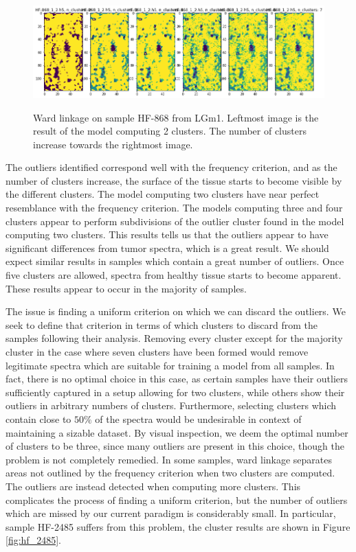 \begin{figure}[H]

    \centering
{\includegraphics[width=15cm]{images/Ward_linkage/LGm-1/HF-868_1_2.h5_0.png} }
\caption{Ward linkage on sample HF-868 from LGm1. Leftmost image is the result of the model computing 2 clusters. The number of clusters increase towards the rightmost image.\label{fig:WL_HF868}}%

\end{figure}

The outliers identified correspond well with the frequency criterion, and as the number of clusters increase, the surface of the tissue starts to become visible by the different clusters. The model computing two clusters have near perfect resemblance with the frequency criterion. The models computing three and four clusters appear to perform subdivisions of the outlier cluster found in the model computing two clusters. This results tells us that the outliers appear to have significant differences from tumor spectra, which is a great result. We should expect similar results in samples which contain a great number of outliers. Once five clusters are allowed, spectra from healthy tissue starts to become apparent. These results appear to occur in the majority of samples.

The issue is finding a uniform criterion on which we can discard the outliers. We seek to define that criterion in terms of which clusters to discard from the samples following their analysis. Removing every cluster except for the majority cluster in the case where seven clusters have been formed would remove legitimate spectra which are suitable for training a model from all samples. In fact, there is no optimal choice in this case, as certain samples have their outliers sufficiently captured in a setup allowing for two clusters, while others show their outliers in arbitrary numbers of clusters. Furthermore, selecting clusters which contain close to $50\%$ of the spectra would be undesirable in context of maintaining a sizable dataset. By visual inspection, we deem the optimal number of clusters to be three, since many outliers are present in this choice, though the problem is not completely remedied. In some samples, ward linkage separates areas not outlined by the frequency criterion when two clusters are computed. The outliers are instead detected when computing more clusters. This complicates the process of finding a uniform criterion, but the number of outliers which are missed by our current paradigm is considerably small. In particular, sample HF-2485 suffers from this problem, the cluster results are shown in Figure \ref{fig:hf_2485}.

